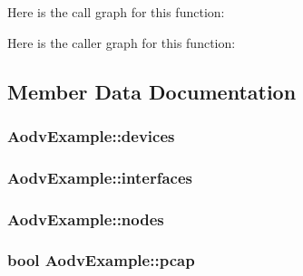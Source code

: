 Here is the call graph for this function\+:




Here is the caller graph for this function\+:




\subsection{Member Data Documentation}
\subsubsection[{\texorpdfstring{devices}{devices}}]{ Aodv\+Example\+::devices\hspace{0.3cm}{\ttfamily [private]}}\hypertarget{classAodvExample_ac84e7dbc2ac26566258b3ec8ee0dd0b3}{}\label{classAodvExample_ac84e7dbc2ac26566258b3ec8ee0dd0b3}
\subsubsection[{\texorpdfstring{interfaces}{interfaces}}]{ Aodv\+Example\+::interfaces\hspace{0.3cm}{\ttfamily [private]}}\hypertarget{classAodvExample_a4208ce6498334663b627c2fa0d2f5ed5}{}\label{classAodvExample_a4208ce6498334663b627c2fa0d2f5ed5}
\subsubsection[{\texorpdfstring{nodes}{nodes}}]{ Aodv\+Example\+::nodes\hspace{0.3cm}{\ttfamily [private]}}\hypertarget{classAodvExample_a6a0e7d16457d9460d27f8a9407e2bb7f}{}\label{classAodvExample_a6a0e7d16457d9460d27f8a9407e2bb7f}
\subsubsection[{\texorpdfstring{pcap}{pcap}}]{\setlength{\rightskip}{0pt plus 5cm}bool Aodv\+Example\+::pcap\hspace{0.3cm}{\ttfamily [private]}}\hypertarget{classAodvExample_a562ab7581322f11c301999cb365ba33e}{}\label{classAodvExample_a562ab7581322f11c301999cb365ba33e}


